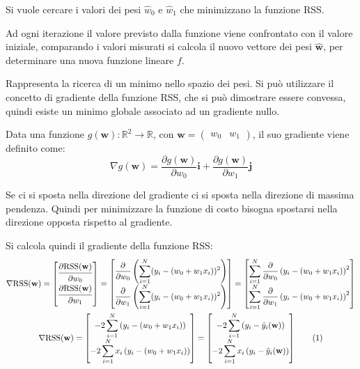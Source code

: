 \documentclass{article}
\numberwithin{equation}{subsection}
\newcommand{\tageq}{\tag{\stepcounter{equation}\theequation}}
\newcommand{\vect}[1]{\boldsymbol{\mathbf{#1}}}
\begin{document}
Si vuole cercare i valori dei pesi $\hat{w}_0$ e $\hat{w}_1$ che minimizzano la funzione RSS. 

Ad ogni iterazione il valore previsto dalla funzione viene confrontato con il valore 
iniziale, comparando i valori misurati si calcola il nuovo vettore dei pesi $\hat{\vect{w}}$, 
per determinare una nuova funzione lineare $f$. 

Rappresenta la ricerca di un minimo nello spazio dei pesi. Si può utilizzare il concetto di 
gradiente della funzione RSS, che si può dimostrare essere convessa, quindi esiste un 
minimo globale associato ad un gradiente nullo. 

Data una funzione $g(\vect{w}):\mathbb{R}^2\to\mathbb{R}$, con $\vect{w}=\begin{pmatrix}w_0&w_1\end{pmatrix}$, il suo gradiente viene definito come:
\begin{equation*}
    \nabla g(\vect{w})=\displaystyle\frac{\partial g(\vect{w})}{\partial w_0}\vect{i}+\frac{\partial g(\vect{w})}{\partial w_1}\vect{j}
\end{equation*}

Se ci si sposta nella direzione del gradiente ci si sposta nella direzione di massima pendenza. Quindi per minimizzare la funzione di costo bisogna spostarsi nella direzione opposta rispetto al gradiente. 

Si calcola quindi il gradiente della funzione RSS:
\begin{gather*}
    \nabla\text{RSS}(\vect{w})=\begin{bmatrix}
        \displaystyle\frac{\strut\partial\text{RSS}(\vect{w})}{\strut\partial w_0}\\
        \displaystyle\frac{\strut\partial\text{RSS}(\vect{w})}{\strut\partial w_1}
    \end{bmatrix}=\begin{bmatrix}
        \displaystyle\frac{\partial}{\partial w_0}\left(\sum_{i=1}^N(y_i-(w_0+w_1x_i))^2\right)\\
        \displaystyle\frac{\partial}{\partial w_1}\left(\sum_{i=1}^N(y_i-(w_0+w_1x_i))^2\right)
    \end{bmatrix}=\begin{bmatrix}
        \displaystyle\sum_{i=1}^N\frac{\partial}{\partial w_0}\left(y_i-(w_0+w_1x_i)\right)^2\\
        \displaystyle\sum_{i=1}^N\frac{\partial}{\partial w_1}\left(y_i-(w_0+w_1x_i)\right)^2
    \end{bmatrix}\\
    \nabla\text{RSS}(\vect{w})=\begin{bmatrix}
        \displaystyle-2\sum_{i=1}^N\left(y_i-({w}_0+{w}_1x_i)\right)\\
        \displaystyle-2\sum_{i=1}^Nx_i\left(y_i-({w}_0+{w}_1x_i)\right)
    \end{bmatrix}=\begin{bmatrix}
        \displaystyle-2\sum_{i=1}^N\left(y_i-\hat{y}_i(\vect{w})\right)\\
        \displaystyle-2\sum_{i=1}^Nx_i\left(y_i-\hat{y}_i(\vect{w})\right)
    \end{bmatrix}\tageq
\end{gather*}
\end{document}
